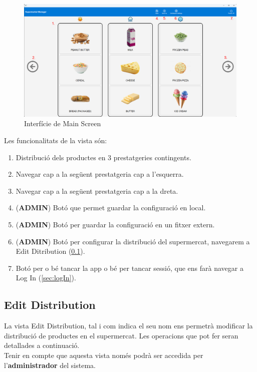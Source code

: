 \documentclass[a4paper,12pt]{article}
\begin{document}
	\begin{figure}[H] 
		\centering
		\includegraphics[width=0.75\linewidth]{assets/mainscreen.png}
		\caption{Interfície de Main Screen}
	\end{figure}
	
	\noindent Les funcionalitats de la vista són:
	
	\begin{enumerate}[itemsep=0pt, topsep=0pt]
		\item Distribució dels productes en 3 prestatgeries contingents.
		\item Navegar cap a la següent prestatgeria cap a l'esquerra.
		\item Navegar cap a la següent prestatgeria cap a la dreta.
		\item (\textbf{ADMIN}) Botó que permet guardar la configuració en local.
		\item (\textbf{ADMIN}) Botó per guardar la configuració en un fitxer extern.
		\item (\textbf{ADMIN}) Botó per configurar la distribució del supermercat, navegarem a Edit Ditribution (\ref{sec:editDistribution}).
		\item Botó per o bé tancar la app o bé per tancar sessió, que ens farà navegar a Log In (\ref{sec:logIn}).
	\end{enumerate}
	
	\newpage
	\subsection{Edit Distribution}
	\label{sec:editDistribution}
	
	La vista Edit Distribution, tal i com indica el seu nom ens permetrà modificar la distribució de productes en el supermercat. Les operacions que pot fer seran detallades a continuació. \\
	
	Tenir en compte que aquesta vista només podrà ser accedida per l'\textbf{administrador} del sistema.
	
\end{document}
